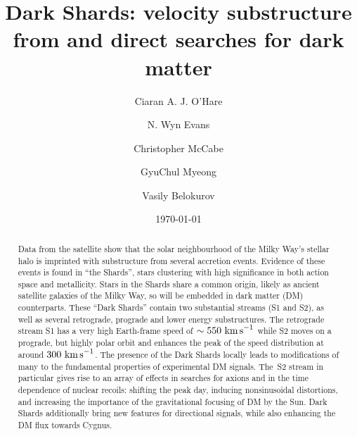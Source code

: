 \documentclass[prd,10pt,twocolumn,showpacs,nofootinbib,aps,superscriptaddress,preprintnumbers]{revtex4-1}
\newcommand{\kms}{\textrm{ km \!s}^{-1}}
\newcommand{\Gaia}{\!{\it Gaia}\xspace}
\begin{document}
 \title{Dark Shards: velocity substructure from \Gaia and direct searches for dark matter}

 \author{Ciaran A. J. O'Hare} 

 \author{N. Wyn Evans} 

 \author{Christopher McCabe} 

 \author{GyuChul Myeong} 

 \author{Vasily Belokurov}


 \date{\today}
 \smallskip
 \begin{abstract}
Data from the \Gaia satellite show that the solar neighbourhood of the
Milky Way's stellar halo is imprinted with substructure from several
accretion events.  Evidence of these events is found in ``the
Shards'', stars clustering with high significance in both action space
and metallicity.  Stars in the Shards share a common origin, likely as
ancient satellite galaxies of the Milky Way, so will be embedded in
dark matter (DM) counterparts.  These ``Dark Shards'' contain two
substantial streams (S1 and S2), as well as several retrograde,
prograde and lower energy substructures.  The retrograde stream S1 has a
very high Earth-frame speed of $\sim 550 \kms$ while S2 moves on a
prograde, but highly polar orbit and enhances the peak of the speed
distribution at around $300 \kms$.  The presence of the Dark Shards
locally leads to modifications of many to the fundamental properties
of experimental DM signals.  The~S2 stream in particular gives rise to
an array of effects in searches for axions and in the time dependence
of nuclear recoils: shifting the peak day, inducing nonsinusoidal
distortions, and increasing the importance of the gravitational
focusing of DM by the Sun.  Dark Shards additionally bring new
features for directional signals, while also enhancing the DM flux
towards Cygnus.
 \end{abstract}
\end{document}
